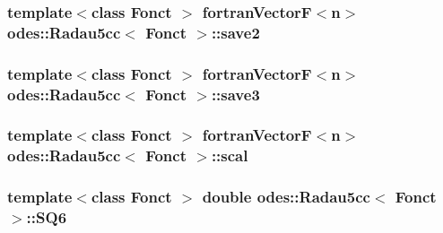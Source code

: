\subsubsection[{save2}]{\setlength{\rightskip}{0pt plus 5cm}template$<$class Fonct $>$ {\bf fortran\+Vector\+F}$<${\bf n}$>$ {\bf odes\+::\+Radau5cc}$<$ Fonct $>$\+::save2\hspace{0.3cm}{\ttfamily [private]}}\label{classodes_1_1Radau5cc_a8928e81eefe11977cd13856b65048dac}
\hypertarget{classodes_1_1Radau5cc_a060ca481b33c11ca111a49b25df64c80}{}
\subsubsection[{save3}]{\setlength{\rightskip}{0pt plus 5cm}template$<$class Fonct $>$ {\bf fortran\+Vector\+F}$<${\bf n}$>$ {\bf odes\+::\+Radau5cc}$<$ Fonct $>$\+::save3\hspace{0.3cm}{\ttfamily [private]}}\label{classodes_1_1Radau5cc_a060ca481b33c11ca111a49b25df64c80}
\hypertarget{classodes_1_1Radau5cc_a5f604f76403a66677e194915e2f2d8d8}{}
\subsubsection[{scal}]{\setlength{\rightskip}{0pt plus 5cm}template$<$class Fonct $>$ {\bf fortran\+Vector\+F}$<${\bf n}$>$ {\bf odes\+::\+Radau5cc}$<$ Fonct $>$\+::scal\hspace{0.3cm}{\ttfamily [private]}}\label{classodes_1_1Radau5cc_a5f604f76403a66677e194915e2f2d8d8}
\hypertarget{classodes_1_1Radau5cc_ab72c18864827bc09b414a8c01e956698}{}
\subsubsection[{S\+Q6}]{\setlength{\rightskip}{0pt plus 5cm}template$<$class Fonct $>$ double {\bf odes\+::\+Radau5cc}$<$ Fonct $>$\+::S\+Q6\hspace{0.3cm}{\ttfamily [private]}}\label{classodes_1_1Radau5cc_ab72c18864827bc09b414a8c01e956698}
\hypertarget{classodes_1_1Radau5cc_a04284948029a635e8d0d4ea79e15c5ea}{}
